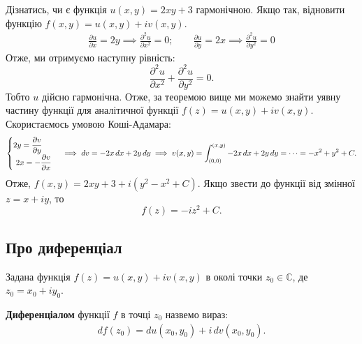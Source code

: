 \documentclass{math_library}
\begin{document}
\begin{example}
Дізнатись, чи є функція $u(x,y)=2xy+3$ гармонічною. Якщо так, відновити функцію $f(x,y) = u(x,y)+iv(x,y)$.
\begin{align*}
\displaystyle\frac{\partial u}{\partial x} = 2y \implies \frac{\partial^2 u}{\partial x^2} = 0; \qquad  \displaystyle\frac{\partial u}{\partial y} = 2x \implies \frac{\partial^2 u}{\partial y^2} = 0
\end{align*}
Отже, ми отримуємо наступну рівність:
\[
\displaystyle\frac{\partial^2 u}{\partial x^2} + \frac{\partial^2 u}{\partial y^2} = 0.
\]
Тобто $u$ дійсно гармонічна. Отже, за теоремою вище ми можемо знайти уявну частину функції для аналітичної функції $f(z)=u(x,y)+iv(x,y)$. Скористаємось умовою Коші-Адамара:
\[
	\begin{cases}
		\displaystyle 2y = \frac{\partial v}{\partial y}\\
		\displaystyle\ 2x = -\frac{\partial v}{\partial x}\\
	\end{cases} \implies dv = -2x\,dx + 2y\,dy\\
	\displaystyle \implies v(x,y) = \int_{(0,0)}^{(x,y)}-2x\,dx+2y\,dy=\cdots=-x^2+y^2+C.
\]
Отже, $f(x,y) = 2xy+3+i(y^2-x^2+C)$. Якщо звести до функції від змінної $z = x+iy$, то \[
f(z) = -iz^2+C.
\]
\end{example}

\subsection{Про диференціал}
Задана функція $f(z) = u(x,y) + i v(x,y)$ в околі точки $z_0 \in \mathbb{C}$, де $z_0 = x_0 + i y_0$.

\begin{definition}
\textbf{Диференціалом} функції $f$ в точці $z_0$ назвемо вираз:
\begin{align*}
df(z_0) = du(x_0,y_0) + i\, dv(x_0,y_0).
\end{align*}
\end{definition}
\end{document}
